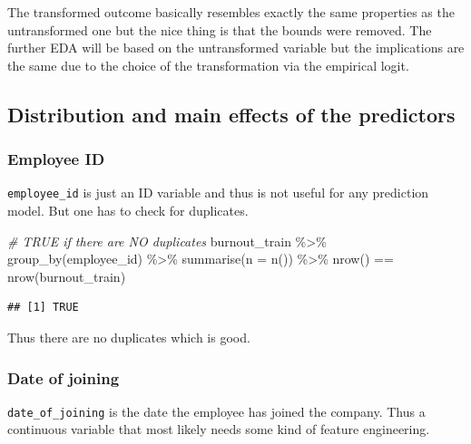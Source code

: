 \documentclass[
]{book}
\newenvironment{Shaded}{\begin{snugshade}}{\end{snugshade}}
\newcommand{\AttributeTok}[1]{\textcolor[rgb]{0.77,0.63,0.00}{#1}}
\newcommand{\CommentTok}[1]{\textcolor[rgb]{0.56,0.35,0.01}{\textit{#1}}}
\newcommand{\FunctionTok}[1]{\textcolor[rgb]{0.00,0.00,0.00}{#1}}
\newcommand{\NormalTok}[1]{#1}
\newcommand{\SpecialCharTok}[1]{\textcolor[rgb]{0.00,0.00,0.00}{#1}}
\begin{document}
The transformed outcome basically resembles exactly the same properties as the untransformed one but the nice thing is that the bounds were removed. The further EDA will be based on the untransformed variable but the implications are the same due to the choice of the transformation via the empirical logit.

\hypertarget{distribution-and-main-effects-of-the-predictors}{%
\subsection{Distribution and main effects of the predictors}\label{distribution-and-main-effects-of-the-predictors}}

\hypertarget{employee-id}{%
\subsubsection{Employee ID}\label{employee-id}}

\texttt{employee\_id} is just an ID variable and thus is not useful for any prediction model. But one has to check for duplicates.

\begin{Shaded}
\begin{Highlighting}[]
\CommentTok{\# TRUE if there are NO duplicates}
\NormalTok{burnout\_train }\SpecialCharTok{\%\textgreater{}\%}
  \FunctionTok{group\_by}\NormalTok{(employee\_id) }\SpecialCharTok{\%\textgreater{}\%}
  \FunctionTok{summarise}\NormalTok{(}\AttributeTok{n =} \FunctionTok{n}\NormalTok{()) }\SpecialCharTok{\%\textgreater{}\%}
  \FunctionTok{nrow}\NormalTok{() }\SpecialCharTok{==} \FunctionTok{nrow}\NormalTok{(burnout\_train)}
\end{Highlighting}
\end{Shaded}

\begin{verbatim}
## [1] TRUE
\end{verbatim}

Thus there are no duplicates which is good.

\hypertarget{date-of-joining}{%
\subsubsection{Date of joining}\label{date-of-joining}}

\texttt{date\_of\_joining} is the date the employee has joined the company. Thus a continuous variable that most likely needs some kind of feature engineering.
\end{document}
